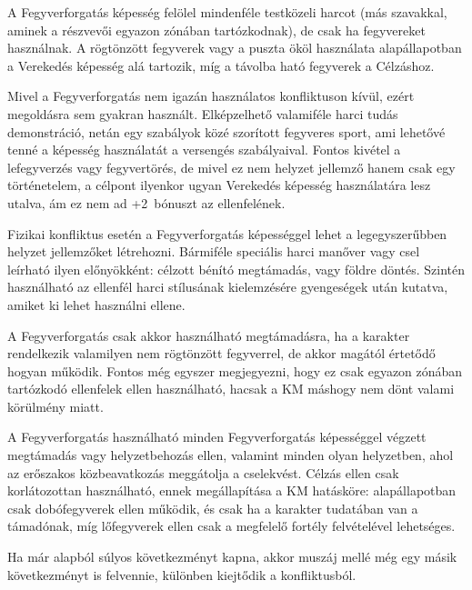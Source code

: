 
A Fegyverforgatás képesség felölel mindenféle testközeli harcot (más szavakkal, aminek a részvevői egyazon zónában tartózkodnak), de csak ha fegyvereket használnak. A rögtönzött fegyverek vagy a puszta ököl használata alapállapotban a Verekedés képesség alá tartozik, míg a távolba ható fegyverek a Célzáshoz.

\overcome Mivel a Fegyverforgatás nem igazán használatos konfliktuson kívül, ezért megoldásra sem gyakran használt. Elképzelhető valamiféle harci tudás demonstráció, netán egy szabályok közé szorított fegyveres sport, ami lehetővé tenné a képesség használatát a versengés szabályaival. Fontos kivétel a lefegyverzés vagy fegyvertörés, de mivel ez nem helyzet jellemző hanem csak egy történetelem, a célpont ilyenkor ugyan Verekedés képesség használatára lesz utalva, ám ez nem ad +2 bónuszt az ellenfelének.

\advantage Fizikai konfliktus esetén a Fegyverforgatás képességgel lehet a legegyszerűbben helyzet jellemzőket létrehozni. Bármiféle speciális harci manőver vagy csel leírható ilyen előnyökként: célzott bénító megtámadás,  vagy földre döntés. Szintén használható az ellenfél harci stílusának kielemzésére gyengeségek után kutatva, amiket ki lehet használni ellene.

\attack A Fegyverforgatás csak akkor használható megtámadásra, ha a karakter rendelkezik valamilyen nem rögtönzött fegyverrel, de akkor magától értetődő hogyan működik. Fontos még egyszer megjegyezni, hogy ez csak egyazon zónában tartózkodó ellenfelek ellen használható, hacsak a KM máshogy nem dönt valami körülmény miatt.

 A Fegyverforgatás használható minden Fegyverforgatás képességgel végzett megtámadás vagy helyzetbehozás ellen, valamint minden olyan helyzetben, ahol az erőszakos közbeavatkozás meggátolja a cselekvést. Célzás ellen csak korlátozottan használható, ennek megállapítása a KM hatásköre: alapállapotban csak dobófegyverek ellen működik, és csak ha a karakter tudatában van a támadónak, míg lőfegyverek ellen csak a megfelelő fortély felvételével lehetséges.




Ha már alapból súlyos következményt kapna, akkor muszáj mellé még egy másik következményt is felvennie, különben kiejtődik a konfliktusból.
